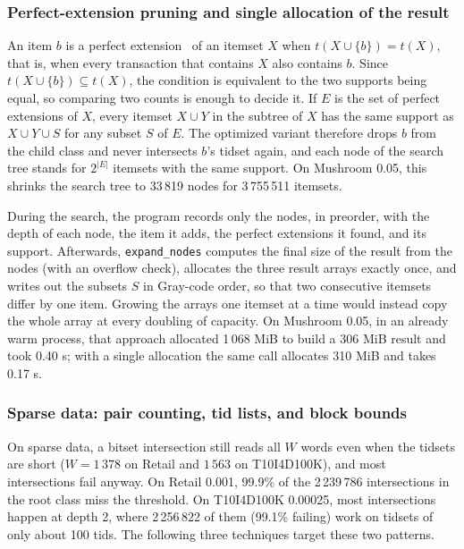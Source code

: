 \subsubsection{Perfect-extension pruning and single allocation of the result}
An item $b$ is a perfect extension~\cite{borgelt2012} of an itemset $X$ when
$t(X \cup \{b\}) = t(X)$, that is, when every transaction that contains $X$ also contains
$b$. Since $t(X \cup \{b\}) \subseteq t(X)$, the condition is equivalent to the two
supports being equal, so comparing two counts is enough to decide it. If $E$ is the set of
perfect extensions of $X$, every itemset $X \cup Y$ in the subtree of $X$ has the same
support as $X \cup Y \cup S$ for any subset $S$ of $E$. The optimized variant therefore
drops $b$ from the child class and never intersects $b$'s tidset again, and each node of
the search tree stands for $2^{|E|}$ itemsets with the same support. On Mushroom 0.05,
this shrinks the search tree to 33\,819 nodes for 3\,755\,511 itemsets.

During the search, the program records only the nodes, in preorder, with the depth of
each node, the item it adds, the perfect extensions it found, and its support. Afterwards,
\texttt{expand\_nodes} computes the final size of the result from the nodes (with an
overflow check), allocates the three result arrays exactly once, and writes out the
subsets $S$ in Gray-code order, so that two consecutive itemsets differ by one item.
Growing the arrays one itemset at a time would instead copy the whole array at every
doubling of capacity. On Mushroom 0.05, in an already warm process, that approach
allocated 1\,068 MiB to build a 306 MiB result and took 0.40 s; with a single allocation
the same call allocates 310 MiB and takes 0.17 s.

\subsubsection{Sparse data: pair counting, tid lists, and block bounds}
On sparse data, a bitset intersection still reads all $W$ words even when the tidsets are
short ($W = 1\,378$ on Retail and $1\,563$ on T10I4D100K), and most intersections fail
anyway. On Retail 0.001, 99.9\% of the 2\,239\,786 intersections in the root class miss
the threshold. On T10I4D100K 0.00025, most intersections happen at depth 2, where
2\,256\,822 of them (99.1\% failing) work on tidsets of only about 100 tids. The following
three techniques target these two patterns.

